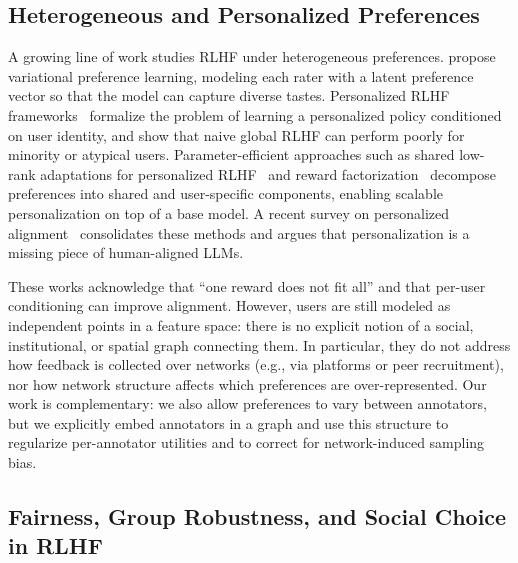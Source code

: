 \documentclass{article}
\theoremstyle{plain}
\theoremstyle{definition}
\theoremstyle{remark}
\begin{document}
\subsection{Heterogeneous and Personalized Preferences}
\label{sec:rw_personalized}

A growing line of work studies RLHF under heterogeneous preferences.
\citet{poddar2024vpl} propose variational preference learning, modeling each rater with a latent preference vector so that the model can capture diverse tastes.
Personalized RLHF frameworks~\citep{li2024personalized_rlhf} formalize the problem of learning a personalized policy conditioned on user identity, and show that naive global RLHF can perform poorly for minority or atypical users.
Parameter-efficient approaches such as shared low-rank adaptations for personalized RLHF~\citep{liu2025shared_lora_prlhf} and reward factorization~\citep{shenfeld2025reward_factorization} decompose preferences into shared and user-specific components, enabling scalable personalization on top of a base model.
A recent survey on personalized alignment~\citep{guan2025personalized_alignment_survey} consolidates these methods and argues that personalization is a missing piece of human-aligned LLMs.

These works acknowledge that “one reward does not fit all” and that per-user conditioning can improve alignment.
However, users are still modeled as independent points in a feature space: there is no explicit notion of a social, institutional, or spatial graph connecting them.
In particular, they do not address how feedback is collected over networks (e.g., via platforms or peer recruitment), nor how network structure affects which preferences are over-represented.
Our work is complementary: we also allow preferences to vary between annotators, but we explicitly embed annotators in a graph and use this structure to regularize per-annotator utilities and to correct for network-induced sampling bias.

\subsection{Fairness, Group Robustness, and Social Choice in RLHF}
\label{sec:rw_fairness}
\end{document}
